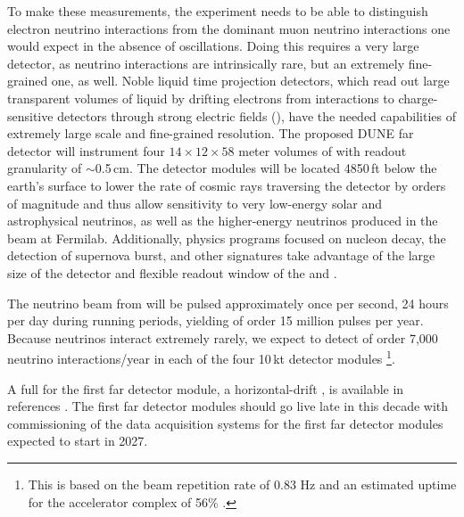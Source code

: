 \documentclass[../main-v1.tex]{subfiles}
\begin{document}
To make these measurements, the experiment needs to be able to distinguish %
electron neutrino interactions  from the dominant muon neutrino interactions one would expect in the absence of oscillations.  %
Doing this requires a very large detector, as neutrino interactions are intrinsically rare, but an extremely  fine-grained one, as well.  Noble liquid  time projection detectors, %
which read out large transparent volumes of liquid by drifting electrons from interactions to charge-sensitive detectors through strong electric fields (), have the needed capabilities of extremely large scale and fine-grained resolution. The proposed DUNE far detector will instrument four  $14\times12 \times58$ meter volumes of  with readout granularity of $\sim$0.5\,cm.  The detector modules will be located 4850\,ft below the earth's surface to lower the rate of cosmic rays traversing the detector by orders of magnitude and thus allow sensitivity to very low-energy solar and astrophysical neutrinos, as well as the higher-energy neutrinos produced in the beam at Fermilab.  %
Additionally, physics programs focused on nucleon decay, the detection of supernova burst, and other  signatures take advantage of the large size of the detector and flexible readout window of the  and . %


The neutrino beam from  will be pulsed approximately once per second, 24 hours per day during running periods, %
yielding of order 15 million pulses per year.  Because neutrinos interact  extremely rarely, we expect to detect of order 7,000 neutrino interactions/year in each of the four 10\,kt detector modules%
\footnote{This is based on the beam repetition rate of 0.83 Hz and an estimated uptime for the accelerator complex of 56\% \cite{Abi:2020evt}.}.


A full  for the first far detector module, a horizontal-drift ,
is available in references%
\cite{DUNE:2020lwj, Abi:2020evt, Abi:2020oxb, Abi:2020loh}.
The first far detector modules should go live late in this decade with commissioning of the data acquisition systems for the first far detector modules expected to start in 2027. %
\end{document}
